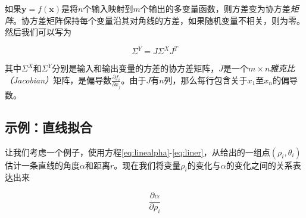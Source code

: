如果$\mathbf{y}=f(\mathbf{x})$是将$n$个输入映射到$m$个输出的多变量函数，则方差变为协方差\emph{矩阵}。协方差矩阵保持每个变量沿其对角线的方差，如果随机变量不相关，则为零。然后我们可以写为

\begin{equation}
\Sigma^Y= J \Sigma^X J^T
\end{equation}


其中$\Sigma^X$和$\Sigma^Y$分别是输入和输出变量的方差的协方差矩阵，$J$是一个$m\times n$\emph{雅克比（Jacobian）}矩阵，是偏导数$\frac{\partial f_i}{\partial x_j}$。由于$J$有$n$列，那么每行包含关于$x_1$至$x_n$的偏导数。

\subsection{示例：直线拟合}
\label{sec:linefitting}


让我们考虑一个例子，使用方程\ref{eq:linealpha}-\ref{eq:liner}，从给出的一组点$(\rho_i,\theta_i)$估计一条直线的角度$\alpha$和距离$r$。现在我们将变量$\rho_i$的变化与$\alpha$的变化之间的关系表达出来

\begin{equation}
\frac{\partial \alpha}{\partial \rho_i}
\end{equation}


